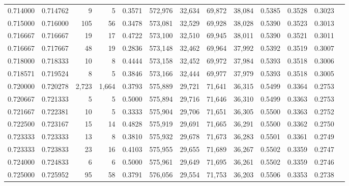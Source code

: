 \begin{tabular}{rrrrrrrrrrrrr}
0.714000 & 0.714762 &      9 &     5 &                                     0.3571 & 572,976 &  32,634 &  69,872 &  38,084 & 0.5385 & 0.3528 & 0.3023 \\
0.715000 & 0.716000 &    105 &    56 &                                     0.3478 & 573,081 &  32,529 &  69,928 &  38,028 & 0.5390 & 0.3523 & 0.3013 \\
0.716667 & 0.716667 &     19 &    17 &                                     0.4722 & 573,100 &  32,510 &  69,945 &  38,011 & 0.5390 & 0.3521 & 0.3011 \\
0.716667 & 0.717667 &     48 &    19 &                                     0.2836 & 573,148 &  32,462 &  69,964 &  37,992 & 0.5392 & 0.3519 & 0.3007 \\
0.718000 & 0.718333 &     10 &     8 &                                     0.4444 & 573,158 &  32,452 &  69,972 &  37,984 & 0.5393 & 0.3518 & 0.3006 \\
0.718571 & 0.719524 &      8 &     5 &                                     0.3846 & 573,166 &  32,444 &  69,977 &  37,979 & 0.5393 & 0.3518 & 0.3005 \\
0.720000 & 0.720278 &  2,723 & 1,664 &                                     0.3793 & 575,889 &  29,721 &  71,641 &  36,315 & 0.5499 & 0.3364 & 0.2753 \\
0.720667 & 0.721333 &      5 &     5 &                                     0.5000 & 575,894 &  29,716 &  71,646 &  36,310 & 0.5499 & 0.3363 & 0.2753 \\
0.721667 & 0.722381 &     10 &     5 &                                     0.3333 & 575,904 &  29,706 &  71,651 &  36,305 & 0.5500 & 0.3363 & 0.2752 \\
0.722500 & 0.723167 &     15 &    14 &                                     0.4828 & 575,919 &  29,691 &  71,665 &  36,291 & 0.5500 & 0.3362 & 0.2750 \\
0.723333 & 0.723333 &     13 &     8 &                                     0.3810 & 575,932 &  29,678 &  71,673 &  36,283 & 0.5501 & 0.3361 & 0.2749 \\
0.723333 & 0.723833 &     23 &    16 &                                     0.4103 & 575,955 &  29,655 &  71,689 &  36,267 & 0.5502 & 0.3359 & 0.2747 \\
0.724000 & 0.724833 &      6 &     6 &                                     0.5000 & 575,961 &  29,649 &  71,695 &  36,261 & 0.5502 & 0.3359 & 0.2746 \\
0.725000 & 0.725952 &     95 &    58 &                                     0.3791 & 576,056 &  29,554 &  71,753 &  36,203 & 0.5506 & 0.3353 & 0.2738 \\

\end{tabular}

